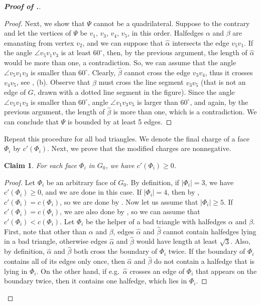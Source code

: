 \documentclass[10pt]{article}
\newtheorem{claim}{Claim}
\theoremstyle{definition}
\begin{document}
\begin{proof}[\bf Proof of .]
\begin{proof}
Next, we show that $\Psi$ cannot be a quadrilateral. Suppose to the contrary and let the vertices of $\Psi$ be $v_1, \, v_3, \, v_4, \, v_5$, in this order. Halfedges $\alpha$ and $\beta$ are emanating from vertex $v_2$, and we can suppose that $\widehat{\alpha}$ intersects the edge $v_5v_1$. If the angle $\angle v_5v_1v_3$ is at least $60^{\circ}$, then, by the previous argument, the length of $\widehat{\alpha}$ would be more than one, a contradiction. So, we can assume that the angle $\angle v_5v_1v_3$ is smaller than $60^{\circ}$. Clearly, $\widehat{\beta}$ cannot cross the edge $v_3v_4$, thus it crosses $v_4v_5$, see , (b). Observe that $\widehat{\beta}$ must cross the line segment $v_3v_5$ (that is not an edge of $G$, drawn with a dotted line segment in the figure).
Since the angle $\angle v_5v_1v_3$ is smaller than $60^{\circ}$, angle $\angle v_1v_3v_5$ is larger than $60^{\circ}$, and again, by the previous argument, the length of $\widehat{\beta}$ is more than one, which is a contradiction.
We can conclude that $\Psi$ is bounded by at least 5 edges.
\end{proof}


Repeat this procedure for all bad triangles. We denote the final charge of a face $\Phi_i$ by $c'(\Phi_i)$.
Next, we prove that the modified charges are nonnegative. 

\begin{claim} \label{main_lemma}
For each face $\Phi_i$ in $G_0$, we have
    $c'(\Phi_i) \geq 0$.
\end{claim}
\begin{proof}
Let $\Phi_i$ be an arbitrary face of $G_0$.
By definition, if $|\Phi_i|=3$, we have $c'(\Phi_i) \geq 0$, and we are done in this case.
If $|\Phi_i|=4$, then by , $c'(\Phi_i)=c(\Phi_i)$, so we are done 
by .
Now let us assume that $|\Phi_i| \geq 5$.
If $c'(\Phi_i) = c(\Phi_i)$, we are also done by , 
so we can assume that $c'(\Phi_i) < c(\Phi_i)$. 
Let $\Phi_i$ be the helper of a bad triangle with halfedges $\alpha$ and $\beta$.
First, note that other than $\alpha$ and $\beta$, edges 
$\widehat{\alpha}$ and $\widehat{\beta}$ cannot contain halfedges 
lying in a bad triangle, otherwise edges $\widehat{\alpha}$ 
and $\widehat{\beta}$ would have length at least $\sqrt{3}$.
Also, by definition, $\widehat{\alpha}$ and $\widehat{\beta}$ 
both cross the boundary of $\Phi_i$ twice.  
If the boundary of $\Phi_i$ contains all of its edges only once, 
then $\widehat{\alpha}$ and $\widehat{\beta}$ do not contain 
a halfedge that is lying in $\Phi_i$. On the other hand, if e.g.\ $\widehat{\alpha}$ 
crosses an edge of $\Phi_i$ that appears on the boundary twice, 
then it contains one halfedge, which lies in $\Phi_i$.


\end{proof}
\end{proof}
\end{document}
